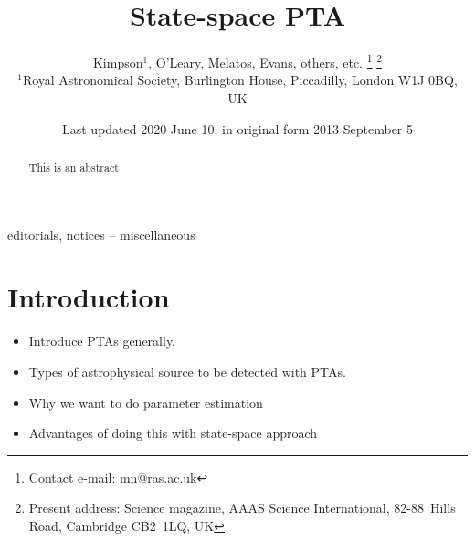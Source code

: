 \documentclass[fleqn,usenatbib,useAMS]{mnras}
\title[Kalman PTA]{State-space PTA}
\author[Kimpson]{Kimpson$^{1}$, O'Leary, Melatos, Evans, others, etc. %
\thanks{Contact e-mail: \href{mailto:mn@ras.ac.uk}{mn@ras.ac.uk}}%
\thanks{Present address: Science magazine, AAAS Science International, \mbox{82-88}~Hills Road, Cambridge CB2~1LQ, UK}%
\\
$^{1}$Royal Astronomical Society, Burlington House, Piccadilly, London W1J 0BQ, UK}
\date{Last updated 2020 June 10; in original form 2013 September 5}
\begin{document}
\label{firstpage}
\pagerange{\pageref{firstpage}--\pageref{lastpage}}
\maketitle

\begin{abstract}
This is an abstract
\end{abstract}

\begin{keywords}
editorials, notices -- miscellaneous
\end{keywords}



\begingroup
\let\clearpage\relax
\endgroup
\newpage

\section{Introduction}


\begin{itemize}
	\item Introduce PTAs generally.
	\item Types of astrophysical source to be detected with PTAs.
	\item Why we want to do parameter estimation
	\item Advantages of doing this with state-space approach
\end{itemize}
\end{document}
